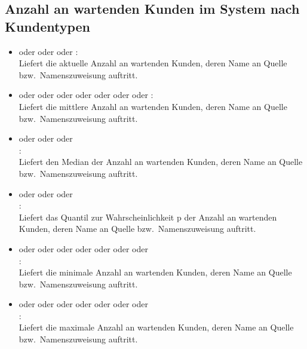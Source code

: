 \subsection{Anzahl an wartenden Kunden im System nach Kundentypen}

\begin{itemize}    

\item
{} oder  oder  oder :\\
Liefert die aktuelle Anzahl an wartenden Kunden, deren Name an Quelle bzw.\ Namenszuweisung  auftritt.
 
\item
{} oder  oder  oder  oder  oder  oder  oder :\\
Liefert die mittlere Anzahl an wartenden Kunden, deren Name an Quelle bzw.\ Namenszuweisung  auftritt.

\item
{} oder  oder  oder\\
:\\
Liefert den Median der Anzahl an wartenden Kunden, deren Name an Quelle bzw.\ Namenszuweisung  auftritt.

\item
{} oder  oder  oder\\
:\\
Liefert das Quantil zur Wahrscheinlichkeit p der Anzahl an wartenden Kunden, deren Name an Quelle bzw.\ Namenszuweisung  auftritt.

\item
{} oder  oder  oder  oder  oder  oder  oder\\
:\\
Liefert die minimale Anzahl an wartenden Kunden, deren Name an Quelle bzw.\ Namenszuweisung  auftritt.

\item
{} oder  oder  oder  oder  oder  oder  oder\\
:\\
Liefert die maximale Anzahl an wartenden Kunden, deren Name an Quelle bzw.\ Namenszuweisung  auftritt.


\end{itemize}
